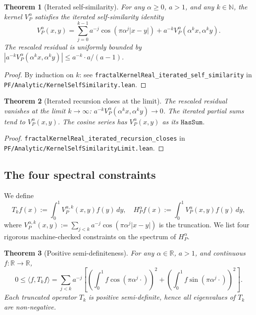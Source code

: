 \documentclass[11pt,a4paper,reqno]{amsart}
\theoremstyle{plain}
\newtheorem{theorem}{Theorem}[section]
\theoremstyle{definition}
\theoremstyle{remark}
\newcommand{\code}[1]{\texttt{#1}}
\newcommand{\HP}{H_{P}}
\newcommand{\VP}{V_{P}}
\begin{document}
\begin{theorem}[Iterated self-similarity]
\label{thm:iterated-self-similarity}
For any $\alpha \ge 0$, $a > 1$, and any $k \in \mathbb{N}$, the
kernel $\VP^{\alpha}$ satisfies the iterated self-similarity identity
\begin{equation}
\label{eq:iterated-self-similarity}
\VP^{\alpha}(x, y) = \sum_{j=0}^{k-1} a^{-j} \cos(\pi \alpha^{j} |x-y|)
+ a^{-k} \VP^{\alpha}(\alpha^{k} x, \alpha^{k} y).
\end{equation}
The rescaled residual is uniformly bounded by
$|a^{-k} \VP^{\alpha}(\alpha^{k} x, \alpha^{k} y)| \le a^{-k} \cdot a/(a-1)$.
\end{theorem}

\begin{proof}
By induction on $k$: see
\code{fractalKernelReal\_iterated\_self\_similarity} in
\code{PF/Analytic/KernelSelfSimilarity.lean}.
\end{proof}

\begin{theorem}[Iterated recursion closes at the limit]
\label{thm:limit-closure}
The rescaled residual vanishes at the limit $k \to \infty$:
$a^{-k} \VP^{\alpha}(\alpha^{k} x, \alpha^{k} y) \to 0$. The iterated
partial sums tend to $\VP^{\alpha}(x, y)$. The cosine series has
$\VP^{\alpha}(x, y)$ as its $\code{HasSum}$.
\end{theorem}

\begin{proof}
\code{fractalKernelReal\_iterated\_recursion\_closes} in
\code{PF/Analytic/KernelSelfSimilarityLimit.lean}.
\end{proof}

\subsection{The four spectral constraints}
\label{subsec:four-constraints}

We define
\[
T_{k} f(x) := \int_{0}^{1} \VP^{\alpha,k}(x, y) f(y) \, dy,
\quad
\HP^{\alpha} f(x) := \int_{0}^{1} \VP^{\alpha}(x, y) f(y) \, dy,
\]
where $\VP^{\alpha,k}(x, y) := \sum_{j < k} a^{-j} \cos(\pi \alpha^{j}
|x - y|)$ is the truncation. We list four rigorous machine-checked
constraints on the spectrum of $\HP^{\alpha}$.

\begin{theorem}[Positive semi-definiteness]
\label{thm:psd-truncated}
For any $\alpha \in \mathbb{R}$, $a > 1$, and continuous
$f : \mathbb{R} \to \mathbb{R}$,
\begin{equation}
\label{eq:psd-truncated}
0 \le \langle f, T_{k} f \rangle
= \sum_{j < k} a^{-j} \left[
\left(\int_{0}^{1} f \cos(\pi \alpha^{j} \cdot) \right)^{2}
+ \left(\int_{0}^{1} f \sin(\pi \alpha^{j} \cdot) \right)^{2}
\right].
\end{equation}
Each truncated operator $T_{k}$ is positive semi-definite, hence all
eigenvalues of $T_{k}$ are non-negative.
\end{theorem}
\end{document}

